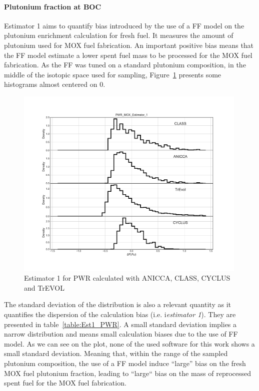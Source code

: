 \paragraph{Plutonium fraction at \gls{BOC}}

Estimator 1 aims to quantify bias introduced by the use of a \gls{FF} model on
the plutonium enrichment calculation for fresh fuel. It measures the amount of
plutonium used for \gls{MOX} fuel fabrication. An important positive bias means
that the \gls{FF} model estimate a lower spent fuel mass to be processed for
the MOX fuel fabrication. As the \gls{FF} was tuned on a standard plutonium
composition, in the middle of the isotopic space used for sampling,
Figure~\ref{fig:Est1_PWR} presents some histograms almost centered on 0.
        

\begin{figure}[h]
	\begin{center}
		\includegraphics[width = 0.99\textwidth]{../../Feature_1/RAW_DATA/FIG/PWR_MOX_Estimator_1.pdf}
		\caption{Estimator 1 for \gls{PWR} calculated with ANICCA, CLASS, CYCLUS and TrEVOL}
		\label{fig:Est1_PWR}
	\end{center}
\end{figure}

The standard deviation of the distribution is also a relevant quantity as it
quantifies the dispersion of the calculation bias (i.e. i\textit{estimator 1}).
They are presented in table~\ref{table:Est1_PWR}. A small standard deviation
implies a narrow distribution and means small calculation biases due to the use
of \gls{FF} model. As we can see on the plot, none of the used software for this
work shows a small standard deviation. Meaning that, within the range of the
sampled plutonium composition, the use of a \gls{FF} model induce ``large'' bias
on the fresh \gls{MOX} fuel plutonium fraction, leading to ``large`` bias on the
mass of reprocessed spent fuel for the \gls{MOX} fuel fabrication.

